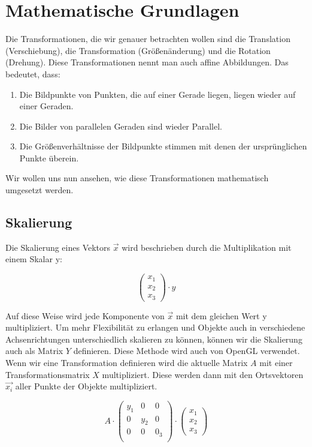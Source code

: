 \newpage

\section{Mathematische Grundlagen}

Die Transformationen, die wir genauer betrachten wollen sind die Translation (Verschiebung), die Transformation (Größenänderung) und die Rotation (Drehung). Diese Transformationen nennt man auch affine Abbildungen. Das bedeutet, dass:
\begin{enumerate}
    \item Die Bildpunkte von Punkten, die auf einer Gerade liegen, liegen wieder auf einer Geraden.
    \item Die Bilder von parallelen Geraden sind wieder Parallel.
    \item Die Größenverhältnisse der Bildpunkte stimmen mit denen der ursprünglichen Punkte überein.
\end{enumerate}

Wir wollen uns nun ansehen, wie diese Transformationen mathematisch umgesetzt werden.

\subsection{Skalierung}
Die Skalierung eines Vektors $\vec{x}$ wird beschrieben durch die Multiplikation mit einem Skalar y:

\[
    \begin{pmatrix}
        x_{1} \\
        x_{2} \\
        x_{3}
    \end{pmatrix}
    \cdot
    y
\]


Auf diese Weise wird jede Komponente von $\vec{x}$ mit dem gleichen Wert y multipliziert. Um mehr Flexibilität zu erlangen und Objekte auch in verschiedene Achsenrichtungen unterschiedlich skalieren zu können, können wir die Skalierung auch als Matrix $Y$ definieren. Diese Methode wird auch von OpenGL verwendet. Wenn wir eine Transformation definieren wird die aktuelle Matrix $A$ mit einer Transformationsmatrix $X$ multipliziert. Diese werden dann mit den Ortsvektoren $\vec{x_{i}}$ aller Punkte der Objekte multipliziert.

\[
    A
    \cdot
    \begin{pmatrix}
        y_{1} & 0     & 0     \\
        0     & y_{2} & 0     \\
        0     & 0     & 0_{3} \\
    \end{pmatrix}
    \cdot
    \begin{pmatrix}
        x_{1} \\
        x_{2} \\
        x_{3}
    \end{pmatrix}
\]


